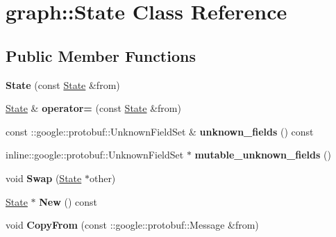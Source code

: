 \hypertarget{classgraph_1_1State}{
\section{graph::State Class Reference}
\label{classgraph_1_1State}
}
\subsection*{Public Member Functions}
\begin{DoxyCompactItemize}
\item 
\hypertarget{classgraph_1_1State_a6adb7a9d2cd11d5be8e4f2b66e0a8be9}{
{\bfseries State} (const \hyperlink{classgraph_1_1State}{State} \&from)}
\label{classgraph_1_1State_a6adb7a9d2cd11d5be8e4f2b66e0a8be9}

\item 
\hypertarget{classgraph_1_1State_ae565f2fef5dc685a53d67b1449672d53}{
\hyperlink{classgraph_1_1State}{State} \& {\bfseries operator=} (const \hyperlink{classgraph_1_1State}{State} \&from)}
\label{classgraph_1_1State_ae565f2fef5dc685a53d67b1449672d53}

\item 
\hypertarget{classgraph_1_1State_a6949f7b56f23e1f22f6ffd92cb22a339}{
const ::google::protobuf::UnknownFieldSet \& {\bfseries unknown\_\-fields} () const }
\label{classgraph_1_1State_a6949f7b56f23e1f22f6ffd92cb22a339}

\item 
\hypertarget{classgraph_1_1State_a7449bfa3aeb18cae2903328f38734898}{
inline::google::protobuf::UnknownFieldSet $\ast$ {\bfseries mutable\_\-unknown\_\-fields} ()}
\label{classgraph_1_1State_a7449bfa3aeb18cae2903328f38734898}

\item 
\hypertarget{classgraph_1_1State_a849d6b8710f8f11340460166556af6a4}{
void {\bfseries Swap} (\hyperlink{classgraph_1_1State}{State} $\ast$other)}
\label{classgraph_1_1State_a849d6b8710f8f11340460166556af6a4}

\item 
\hypertarget{classgraph_1_1State_a86924d60268be8025b78b75764061494}{
\hyperlink{classgraph_1_1State}{State} $\ast$ {\bfseries New} () const }
\label{classgraph_1_1State_a86924d60268be8025b78b75764061494}

\item 
\hypertarget{classgraph_1_1State_a4d9ab6623e196805d8980da3c86c282e}{
void {\bfseries CopyFrom} (const ::google::protobuf::Message \&from)}
\label{classgraph_1_1State_a4d9ab6623e196805d8980da3c86c282e}


\end{DoxyCompactItemize}
